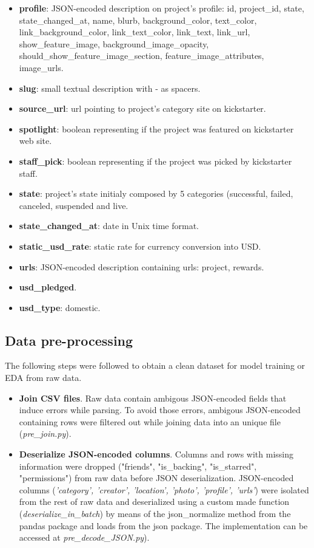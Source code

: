 \documentclass{article}
\begin{document}
{\begin{itemize}
    \item \textbf{profile}: JSON-encoded description on project's profile: id, project\_id, state, state\_changed\_at, name, blurb, background\_color, text\_color, link\_background\_color, link\_text\_color, link\_text, link\_url, show\_feature\_image, background\_image\_opacity, should\_show\_feature\_image\_section, feature\_image\_attributes, image\_urls. 
    \item \textbf{slug}: small textual description with - as spacers.
    \item \textbf{source\_url}: url pointing to project's category site on kickstarter.
    \item \textbf{spotlight}: boolean representing if the project was featured on kickstarter web site.
    \item \textbf{staff\_pick}: boolean representing if the project was picked by kickstarter staff.
    \item \textbf{state}: project's state initialy composed by 5 categories (successful, failed, canceled, suspended and live.
    \item \textbf{state\_changed\_at}: date in Unix time format.
    \item \textbf{static\_usd\_rate}: static rate for currency conversion into USD.
    \item \textbf{urls}: JSON-encoded description containing urls: project, rewards.
    \item \textbf{usd\_pledged}.
    \item \textbf{usd\_type}: domestic.
    
\end{itemize} 

\subsection{Data pre-processing}
\label{subsec:data_prepro}
The following steps were followed to obtain a clean dataset for model training or EDA from raw data.
\begin{itemize}
    \item \textbf{Join CSV files}.
Raw data contain ambigous JSON-encoded fields that induce errors while parsing. To avoid those errors, ambigous JSON-encoded containing rows were filtered out while joining data into an unique file (\emph{pre\_join.py}).

    \item \textbf{Deserialize JSON-encoded columns}.
Columns and rows with missing information were dropped ("friends", "is\_backing", "is\_starred", "permissions") from raw data before JSON deserialization.
JSON-encoded columns (\emph{'category', 'creator', 'location', 'photo', 'profile', 'urls'}) were isolated from the rest of raw data and deserialized using a custom made function (\emph{deserialize\_in\_batch}) by means of the json\_normalize method from the pandas package and loads from the json package. The implementation can be accessed at \emph{pre\_decode\_JSON.py}).


\end{itemize}}
\end{document}
